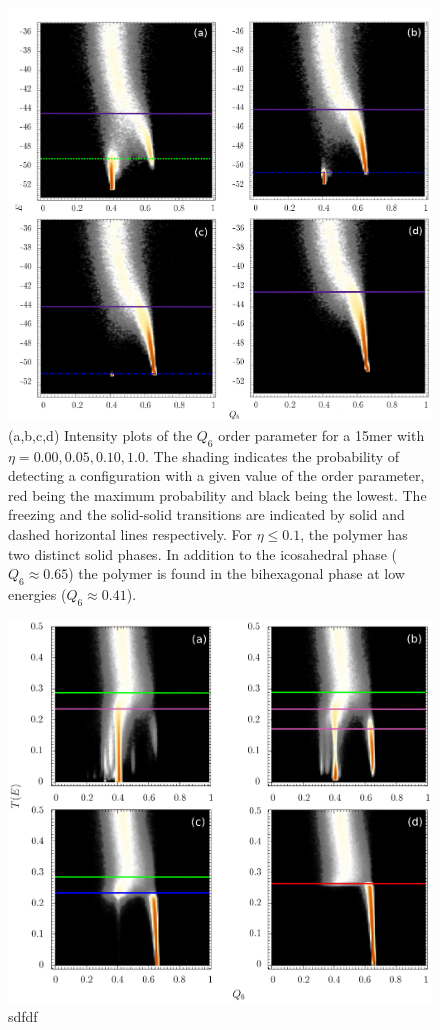 \documentclass[12pt]{report}
\begin{document}
\begin{figure}
\center
	\includegraphics[width=\textwidth]{chapter6Figs/structuralAnalysis15.eps}
\caption{\label{intensity_plots}(a,b,c,d) Intensity plots of the
$Q_{6}$ order parameter for a 15mer with $\eta = 0.00, 0.05, 0.10, 1.0$.
The shading indicates the probability of detecting a configuration with a
given value of the order parameter, red being the maximum probability and
black being the lowest. The freezing and the solid-solid transitions are
indicated by solid and dashed horizontal lines respectively. For $\eta \leq
0.1$, the polymer has two distinct solid phases.  In addition to the
icosahedral phase ($Q_{6} \approx 0.65$) the polymer is found in the
bihexagonal phase at low energies ($Q_{6} \approx 0.41$).}
\end{figure}
%
%
\begin{figure}
\center
\includegraphics[width=\textwidth]{chapter6Figs/structuralAnalysis55.eps}
	\caption{\label{intensity_plots}
     sdfdf}
\end{figure}
\end{document}
